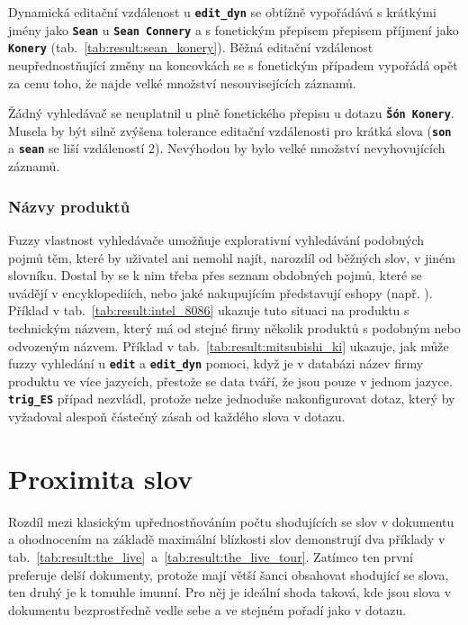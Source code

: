 \documentclass[11pt,letterpaper,oneside,openright]{book}
\newcommand{\bftt}[1]{\texttt{\textbf{#1}}}
\begin{document}
\mbox{}\mbox{}

Dynamická editační vzdálenost u \bftt{edit\_dyn} se obtížně vypořádává s
krátkými jmény jako \bftt{Sean} u \bftt{Sean Connery} a s fonetickým přepisem
přepisem příjmení jako \bftt{Konery} (tab.~\ref{tab:result:sean_konery}). Běžná
editační vzdálenost neupřednostňující změny na koncovkách se s fonetickým
případem vypořádá opět za cenu toho, že najde velké množství nesouvisejících
záznamů.

Žádný vyhledávač se neuplatnil u plně fonetického přepisu u dotazu \bftt{Šón
Konery}. Musela by být silně zvýšena tolerance editační vzdálenosti pro krátká
slova (\bftt{son} a \bftt{sean} se liší vzdáleností 2). Nevýhodou by bylo velké
množství nevyhovujících záznamů.

\subsubsection{Názvy produktů}

\mbox{}\mbox{}

Fuzzy vlastnost vyhledávače umožňuje explorativní vyhledávání podobných pojmů
těm, které by uživatel ani nemohl najít, narozdíl od běžných slov, v jiném
slovníku. Dostal by se k nim třeba přes seznam obdobných pojmů, které se
uvádějí v encyklopediích, nebo jaké nakupujícím představují eshopy (např.
). Příklad v tab.~\ref{tab:result:intel_8086}
ukazuje tuto situaci na produktu s technickým názvem, který má od stejné firmy
několik produktů s podobným nebo odvozeným názvem. Příklad v
tab.~\ref{tab:result:mitsubishi_ki} ukazuje, jak může fuzzy vyhledání u
\bftt{edit} a \bftt{edit\_dyn} pomoci, když je v databázi název firmy produktu
ve více jazycích, přestože se data tváří, že jsou pouze v jednom jazyce.
\bftt{trig\_ES} případ nezvládl, protože nelze jednoduše nakonfigurovat dotaz,
který by vyžadoval alespoň částečný zásah od každého slova v dotazu.

\mbox{}\mbox{}




\section{Proximita slov}
Rozdíl mezi klasickým upřednostňováním počtu shodujících se slov v
dokumentu a ohodnocením na základě maximální blízkosti slov demonstrují
dva příklady v
tab.~\ref{tab:result:the_live}~a~\ref{tab:result:the_live_tour}. Zatímco
ten první preferuje delší dokumenty, protože mají větší šanci obsahovat
shodující se slova, ten druhý je k tomuhle imunní. Pro něj je ideální
shoda taková, kde jsou slova v dokumentu bezprostředně vedle sebe a ve
stejném pořadí jako v dotazu.
\end{document}
